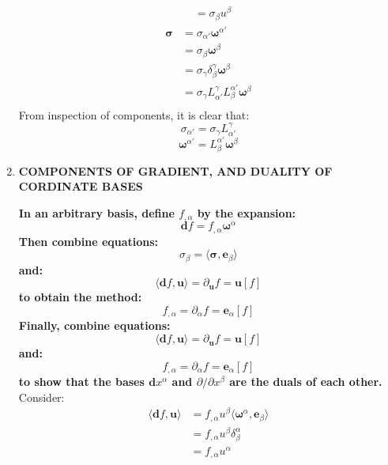 \documentclass[9pt]{report}
\begin{document}
\begin{enumerate}
\[\begin{align}
                                                          &= \sigma_\beta u^\beta
    \end{align}
  \]
  \[
    \begin{align}
    \boldsymbol{\sigma} &= \sigma_{\alpha'}\boldsymbol{\omega}^{\alpha'}\\
                        &= \sigma_\beta \boldsymbol{\omega}^\beta \\
                        &= \sigma_\gamma \delta^\gamma_\beta \boldsymbol{\omega}^\beta \\
                        &= \sigma_\gamma L^\gamma_{\alpha'} L^{\alpha'}_\beta \boldsymbol{\omega}^\beta \\
    \end{align}
  \]
  From inspection of components, it is clear that:
  \[
    \sigma_{\alpha'} = \sigma_\gamma L^\gamma_{\alpha'}
  \]
  \[
    \boldsymbol{\omega}^{\alpha'} = L^{\alpha'}_\beta \boldsymbol{\omega}^\beta
  \]
\item \textbf{COMPONENTS OF GRADIENT, AND DUALITY OF CORDINATE BASES}

  \textbf{In an arbitrary basis, define $f_{,\alpha}$ by the expansion:}
  \[
    \boldsymbol{d}f = f_{,\alpha} \boldsymbol{\omega}^\alpha
  \]
  \textbf{Then combine equations:}
  \[
    \sigma_\beta = \langle \boldsymbol{\sigma}, \boldsymbol{e}_\beta \rangle
  \]
  \textbf{and:}
  \[
    \langle \boldsymbol{d} f, \boldsymbol{u} \rangle = \partial_{\boldsymbol{u}} f = \boldsymbol{u}[f]
  \]
  \textbf{to obtain the method:}
  \[
    f_{,\alpha} = \partial_{\alpha} f = \boldsymbol{e}_\alpha [f]
  \]
  \textbf{Finally, combine equations:}
  \[
    \langle \boldsymbol{d} f, \boldsymbol{u} \rangle = \partial_{\boldsymbol{u}} f = \boldsymbol{u}[f]
  \]
  \textbf{and:}
  \[
    f_{,\alpha} = \partial_{\alpha} f = \boldsymbol{e}_\alpha [f]
  \]
  \textbf{to show that the bases $\boldsymbol{d}x^\alpha$ and $\partial / \partial x^\beta$ are the duals of each other.}
  Consider:
  \[
    \begin{align}
      \langle \boldsymbol{d}f, \boldsymbol{u} \rangle &= f_{,\alpha} u^\beta \langle \boldsymbol{\omega}^\alpha, \boldsymbol{e}_\beta \rangle \\
                                                      &= f_{,\alpha} u^\beta \delta^\alpha_\beta \\
                                                      &= f_{,\alpha} u^\alpha
    \end{align}
  \]
\end{enumerate}
\end{document}
